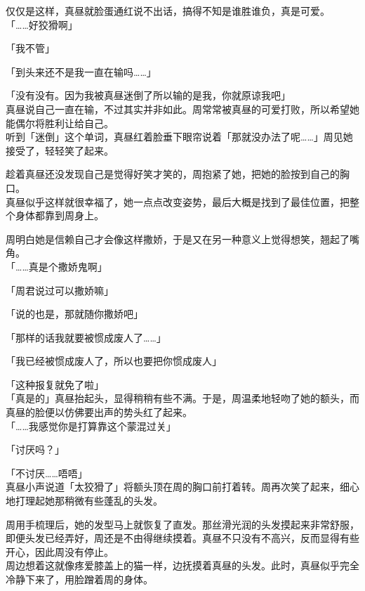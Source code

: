 仅仅是这样，真昼就脸蛋通红说不出话，搞得不知是谁胜谁负，真是可爱。\\

「……好狡猾啊」

「我不管」

「到头来还不是我一直在输吗……」

「没有没有。因为我被真昼迷倒了所以输的是我，你就原谅我吧」\\

真昼说自己一直在输，不过其实并非如此。周常常被真昼的可爱打败，所以希望她能偶尔将胜利让给自己。\\

听到「迷倒」这个单词，真昼红着脸垂下眼帘说着「那就没办法了呢……」周见她接受了，轻轻笑了起来。

趁着真昼还没发现自己是觉得好笑才笑的，周抱紧了她，把她的脸按到自己的胸口。\\

真昼似乎这样就很幸福了，她一点点改变姿势，最后大概是找到了最佳位置，把整个身体都靠到周身上。

周明白她是信赖自己才会像这样撒娇，于是又在另一种意义上觉得想笑，翘起了嘴角。\\

「……真是个撒娇鬼啊」

「周君说过可以撒娇嘛」

「说的也是，那就随你撒娇吧」

「那样的话我就要被惯成废人了……」

「我已经被惯成废人了，所以也要把你惯成废人」

「这种报复就免了啦」\\

「真是的」真昼抬起头，显得稍稍有些不满。于是，周温柔地轻吻了她的额头，而真昼的脸便以仿佛要出声的势头红了起来。\\

「……我感觉你是打算靠这个蒙混过关」

「讨厌吗？」

「不讨厌……唔唔」\\

真昼小声说道「太狡猾了」将额头顶在周的胸口前打着转。周再次笑了起来，细心地打理起她那稍微有些蓬乱的头发。

周用手梳理后，她的发型马上就恢复了直发。那丝滑光润的头发摸起来非常舒服，即便头发已经弄好，周还是不由得继续摸着。真昼不只没有不高兴，反而显得有些开心，因此周没有停止。\\

周边想着这就像疼爱膝盖上的猫一样，边抚摸着真昼的头发。此时，真昼似乎完全冷静下来了，用脸蹭着周的身体。\\

